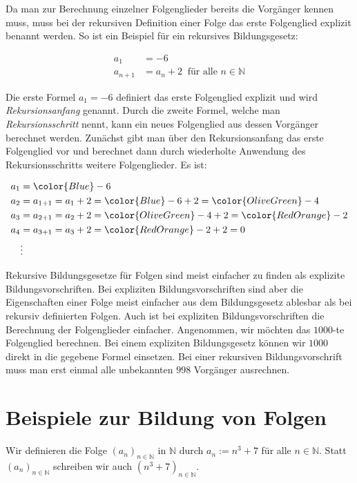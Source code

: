 \documentclass[fontsize=9pt,
               parskip=half-,
               DIV=14,
               listof=chapterentry,
               tocflat]{scrbook}
\begin{document}
Da man zur Berechnung einzelner Folgenglieder bereits die Vorgänger kennen muss, muss bei der rekursiven Definition einer Folge das erste Folgenglied explizit benannt werden. So ist ein Beispiel für ein rekursives Bildungsgesetz:

\begin{align*}
a_{1}&=-6\\a_{n+1}&=a_{n}+2\ {\text{ für alle }}n\in \mathbb {N} 
\end{align*}

Die erste Formel $a_{1}=-6$ definiert das erste Folgenglied explizit und wird \emph{Rekursionsanfang} genannt. Durch die zweite Formel, welche man \emph{Rekursionsschritt} nennt, kann ein neues Folgenglied aus dessen Vorgänger berechnet werden. Zunächst gibt man über den Rekursionsanfang das erste Folgenglied vor und berechnet dann durch wiederholte Anwendung des Rekursionsschritts weitere Folgenglieder. Es ist:

\begin{align*}
a_{1}&={\color {Blue}-6}\\a_{2}&=a_{1+1}=a_{1}+2={\color {Blue}-6}+2={\color {OliveGreen}-4}\\a_{3}&=a_{2+1}=a_{2}+2={\color {OliveGreen}-4}+2={\color {RedOrange}-2}\\a_{4}&=a_{3+1}=a_{3}+2={\color {RedOrange}-2}+2=0\\&\vdots 
\end{align*}

Rekursive Bildungsgesetze für Folgen sind meist einfacher zu finden als explizite Bildungsvorschriften. Bei expliziten Bildungsvorschriften sind aber die Eigenschaften einer Folge meist einfacher aus dem Bildungsgesetz ablesbar als bei rekursiv definierten Folgen. Auch ist bei expliziten Bildungsvorschriften die Berechnung der Folgenglieder einfacher. Angenommen, wir möchten das $1000$-te Folgenglied berechnen. Bei einem expliziten Bildungsgesetz können wir $1000$ direkt in die gegebene Formel einsetzen. Bei einer rekursiven Bildungsvorschrift muss man erst einmal alle unbekannten $998$ Vorgänger ausrechnen.

\clearpage

\section{Beispiele zur Bildung von Folgen}

\begin{example*}
Wir definieren die Folge $(a_{n})_{n\in \mathbb {N} }$ in $\mathbb {N} $ durch $a_{n}:=n^{3}+7$ für alle $n\in \mathbb {N} $. Statt $(a_{n})_{n\in \mathbb {N} }$ schreiben wir auch $(n^{3}+7)_{n\in \mathbb {N} }$.

\end{example*}
\end{document}
